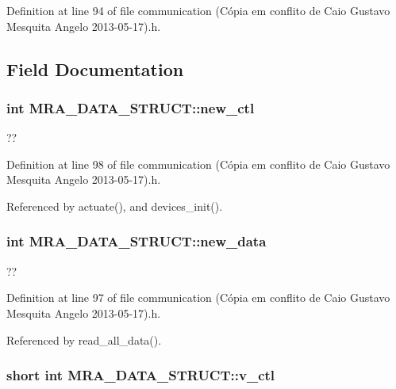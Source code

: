 Definition at line 94 of file communication (\-Cópia em conflito de Caio Gustavo Mesquita Angelo 2013-\/05-\/17).\-h.



\subsection{Field Documentation}
\hypertarget{structMRA__DATA__STRUCT_a5b1af89ee717f5b14c18e8ac12e93e75}{
\subsubsection[{new\-\_\-ctl}]{\setlength{\rightskip}{0pt plus 5cm}int M\-R\-A\-\_\-\-D\-A\-T\-A\-\_\-\-S\-T\-R\-U\-C\-T\-::new\-\_\-ctl}}\label{structMRA__DATA__STRUCT_a5b1af89ee717f5b14c18e8ac12e93e75}


?? 



Definition at line 98 of file communication (\-Cópia em conflito de Caio Gustavo Mesquita Angelo 2013-\/05-\/17).\-h.



Referenced by actuate(), and devices\-\_\-init().

\hypertarget{structMRA__DATA__STRUCT_afca6e851d302f3a786885a4e1eec79d7}{
\subsubsection[{new\-\_\-data}]{\setlength{\rightskip}{0pt plus 5cm}int M\-R\-A\-\_\-\-D\-A\-T\-A\-\_\-\-S\-T\-R\-U\-C\-T\-::new\-\_\-data}}\label{structMRA__DATA__STRUCT_afca6e851d302f3a786885a4e1eec79d7}


?? 



Definition at line 97 of file communication (\-Cópia em conflito de Caio Gustavo Mesquita Angelo 2013-\/05-\/17).\-h.



Referenced by read\-\_\-all\-\_\-data().

\hypertarget{structMRA__DATA__STRUCT_a64b4e6bb604e58de593a60c87942b966}{
\subsubsection[{v\-\_\-ctl}]{\setlength{\rightskip}{0pt plus 5cm}short int M\-R\-A\-\_\-\-D\-A\-T\-A\-\_\-\-S\-T\-R\-U\-C\-T\-::v\-\_\-ctl}}\label{structMRA__DATA__STRUCT_a64b4e6bb604e58de593a60c87942b966}


